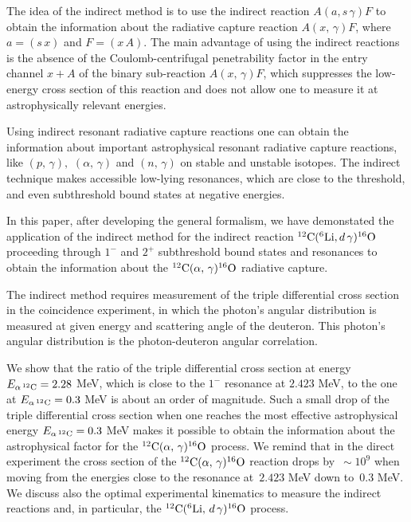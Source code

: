 \documentclass[prl,unsortedaddress,groupedaddress,twocolumn,amsmath,amsfonts,amssymb,showpacs,floatfix,nofootinbib]{revtex4}
\begin{document}
The idea of the indirect method is to use the indirect reaction $A(a, s\,\gamma)F$ to obtain the information about the radiative capture reaction $A(x,\,\gamma)F$, where $a=(s\,x)$ and $F=(x\,A)$. The main advantage of using the indirect reactions is the absence of the Coulomb-centrifugal penetrability factor in the entry channel $x+A$ of the binary sub-reaction $A(x,\,\gamma)F$, which suppresses the low-energy cross section of this reaction and does not allow one to measure it at astrophysically relevant energies. 

Using indirect resonant radiative capture reactions one can obtain the information about important astrophysical resonant radiative capture reactions, like $(p,\,\gamma), \,\,(\alpha,\,\gamma)$ and $(n,\,\gamma)$ on stable and unstable isotopes. The indirect technique makes accessible low-lying resonances, which are close to the threshold, and even subthreshold bound states at negative energies. 

In this paper, after developing the general formalism, we have demonstated the application of the indirect method for the indirect reaction ${}^{12}{\rm C}({}^{6}{\rm Li},d\,\gamma){}^{16}{\rm O}$ proceeding through $1^{-}$ and $2^{+}$ subthreshold bound states and resonances to obtain the information about the ${}^{12}{\rm C}(\alpha,\,\gamma){}^{16}{\rm O}$ radiative capture.

The indirect method requires measurement of the triple differential cross section in the coincidence experiment, in which the photon's angular distribution is measured at given
energy and scattering angle of the deuteron. This photon's angular distribution is the photon-deuteron angular correlation.

We show that the ratio of the triple differential cross section  at energy $E_{\alpha\,{}^{12}{\rm C}}=2.28$ MeV, which is close to the $1^{-}$ resonance at $2.423$ MeV, to the one at  $E_{\alpha\,{}^{12}{\rm C}}=0.3$ MeV is about an order of magnitude. Such a small drop of the triple differential cross section when one reaches the most effective astrophysical energy 
$E_{\alpha\,{}^{12}{\rm C}}=0.3$ MeV makes it possible to obtain the information about the astrophysical factor for the ${}^{12}{\rm C}(\alpha,\,\gamma){}^{16}{\rm O}$ process. We remind that in the direct experiment the cross section of the ${}^{12}{\rm C}(\alpha,\,\gamma){}^{16}{\rm O}$ reaction drops by $\,\sim 10^{9}$ when moving from the energies close to the resonance at $\,2.423$ MeV down to $\,0.3$ MeV.
We discuss also the optimal experimental kinematics to measure the indirect reactions and, in particular, the ${}^{12}{\rm C}({}^{6}{\rm Li},\,d\,\gamma){}^{16}{\rm O}$ process.
\end{document}
